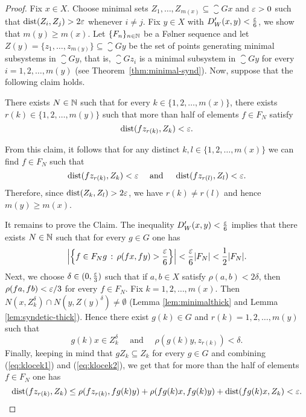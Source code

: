 \begin{proof}
Fix $x\in X$. Choose minimal sets $Z_1,\ldots, Z_{m(x)}\subseteq \closure{Gx}$ and $\varepsilon>0$ such that $\operatorname{dist}(Z_i,Z_j)>2\varepsilon$ whenever $i\neq j$. Fix $y\in X$ with $D_W'(x,y)<\frac{\varepsilon}{6}$, we show that $m(y)\geq m(x)$. Let $\{F_n\}_{n\in\mathbb{N}}$ be a F{\o}lner sequence and let $Z(y)=\{z_1,\ldots, z_{m(y)}\}\subseteq \closure{Gy}$ be the set of points generating minimal subsystems in $\closure{Gy}$, that is, $\closure{Gz_i}$ is a minimal subsystem in $\closure{Gy}$ for every $i=1,2,\ldots,m(y)$ (see Theorem~\ref{thm:minimal-synd}). 
Now, suppose that the following claim holds.
\begin{claim}
There exists $N\in\mathbb{N}$ such that for every $k\in\{1,2,\ldots,m(x)\}$, there exists $r(k)\in\{1,2,\ldots,m(y)\}$ such that  more  than half of elements $f\in F_N$ satisfy
\[
\operatorname{dist}(fz_{r(k)}, Z_k)< \varepsilon.
\]
\end{claim}

From this claim, it follows that for any distinct $k,l\in\{1,2,\ldots,m(x)\}$ we can find $f\in F_N$ such that
\[
\operatorname{dist}(fz_{r(k)}, Z_k)< \varepsilon \quad \text{ and }\quad \operatorname{dist}(fz_{r(l)}, Z_l)<\varepsilon.
\]
Therefore, since $\operatorname{dist}(Z_k,Z_l)>2\varepsilon$, we have $r(k)\neq r(l)$ and hence $m(y)\geq m(x)$.

It remains to prove the Claim. The inequality $D_W'(x,y)<\frac{\varepsilon}{6}$ implies that there exists $N\in\mathbb{N}$ such that for every $g\in G$ one has 
\begin{equation}\label{eq:klocek1}
\left|\left\{f\in F_Ng\,:\,\rho(fx, fy)>\frac{\varepsilon}{6}\right\}\right|<\frac{\varepsilon}{6}|F_N|<\frac{1}{2}|F_N|.
\end{equation}
Next, we choose $\delta\in(0,\frac{\varepsilon}{3})$ such that if $a,b\in X$ satisfy $\rho(a,b)<2\delta$, then $\rho(fa, fb)<\varepsilon/3$ for every  $f\in F_N$. Fix $k=1,2,\ldots,m(x)$. Then $N(x, Z_k^{\delta})\cap N(y, Z(y)^{\delta})\neq\emptyset$ (Lemma \ref{lem:minimalthick} and Lemma \ref{lem:syndetic-thick}). Hence there exist $g(k)\in G$ and $r(k)=1,2,\ldots,m(y)$ such that 
\begin{equation}\label{eq:klocek2}
g(k)x\in Z_k^{\delta}\quad \text{ and }\quad \rho(g(k)y,z_{r(k)})<\delta.
\end{equation}
Finally, keeping in mind that $gZ_k\subseteq Z_k$ for every $g\in G$ and combining (\ref{eq:klocek1}) and (\ref{eq:klocek2}), we get that for more than the half of elements $f\in F_N$ one has 
\[
\operatorname{dist}(fz_{r(k)}, Z_k)\leq \rho(fz_{r(k)},fg(k)y)+\rho(fg(k)x,fg(k)y)+\operatorname{dist} (fg(k)x, Z_k)<\varepsilon.\qedhere
\]
\end{proof}

